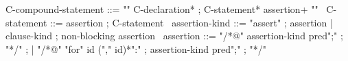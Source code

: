 \begin{syntax}
  C-compound-statement ::=
      "{" C-declaration* ;
      C-statement* assertion+ "}"
  \
  C-statement ::= assertion ;
                  C-statement
  \
  assertion-kind ::= "assert" ; assertion
                   | clause-kind ; non-blocking assertion
  \
  assertion ::= "/*@" assertion-kind pred";" ;
    "*/" ;
  | { "/*@" "for" id ("," id)*":" } ;
    { assertion-kind pred";" };
    { "*/" }
\end{syntax}
